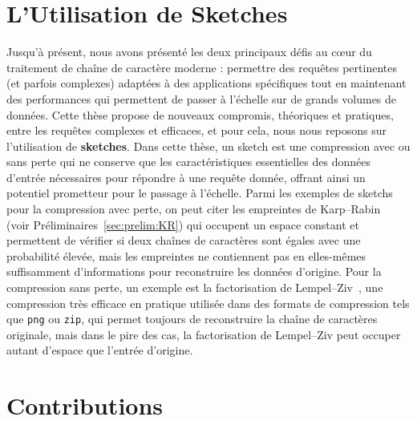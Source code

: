 \section*{L'Utilisation de Sketches}

Jusqu'à présent, nous avons présenté les deux principaux défis au cœur du traitement de chaîne de caractère moderne : permettre des requêtes pertinentes (et parfois complexes) adaptées à des applications spécifiques tout en maintenant des performances qui permettent de passer à l'échelle sur de grands volumes de données.
%
Cette thèse propose de nouveaux compromis, théoriques et pratiques, entre les requêtes complexes et efficaces, et pour cela, nous nous reposons sur l'utilisation de \textbf{sketches}.
%
Dans cette thèse, un sketch est une compression avec ou sans perte qui ne conserve que les caractéristiques essentielles des données d'entrée nécessaires pour répondre à une requête donnée, offrant ainsi un potentiel prometteur pour le passage à l'échelle. 
Parmi les exemples de sketchs pour la compression avec perte, on peut citer les empreintes de Karp--Rabin~\cite{KRfingerprint} (voir Préliminaires~\ref{sec:prelim:KR}) qui occupent un espace constant et permettent de vérifier si deux chaînes de caractères sont égales avec une probabilité élevée, mais les empreintes ne contiennent pas en elles-mêmes suffisamment d'informations pour reconstruire les données d'origine.
Pour la compression sans perte, un exemple est la factorisation de Lempel--Ziv~\cite{ziv1977universal}, une compression très efficace en pratique utilisée dans des formats de compression tels que \texttt{png} ou \texttt{zip}, qui permet toujours de reconstruire la chaîne de caractères originale, mais dans le pire des cas, la factorisation de Lempel--Ziv peut occuper autant d'espace que l'entrée d'origine.

\section*{Contributions}

